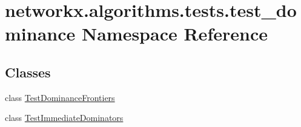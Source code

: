 \hypertarget{namespacenetworkx_1_1algorithms_1_1tests_1_1test__dominance}{}\section{networkx.\+algorithms.\+tests.\+test\+\_\+dominance Namespace Reference}
\label{namespacenetworkx_1_1algorithms_1_1tests_1_1test__dominance}
\subsection*{Classes}
\begin{DoxyCompactItemize}
\item 
class \hyperlink{classnetworkx_1_1algorithms_1_1tests_1_1test__dominance_1_1TestDominanceFrontiers}{Test\+Dominance\+Frontiers}
\item 
class \hyperlink{classnetworkx_1_1algorithms_1_1tests_1_1test__dominance_1_1TestImmediateDominators}{Test\+Immediate\+Dominators}
\end{DoxyCompactItemize}
